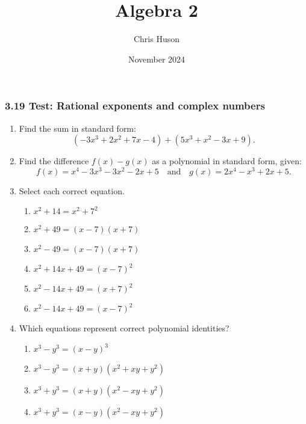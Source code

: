 \documentclass[12pt, twoside]{article}
\title{Algebra 2}
\author{Chris Huson}
\date{November 2024}
\begin{document}
\subsubsection*{3.19 Test: Rational exponents and complex numbers}
\begin{enumerate}[itemsep=0.5cm]
\subsubsection*{A1-APR.1 Perform operations with polynomials}
\item Find the sum in standard form:
\[
(- 3x^3 + 2x^2 + 7x - 4) + (5x^3 + x^2 - 3x + 9).
\] \vspace{4cm}

\item Find the difference \(f(x) - g(x)\) as a polynomial in standard form, given:
\[
f(x) = x^4 - 3x^3 - 3x^2 - 2x + 5 \quad \text{and} \quad g(x) = 2x^4 - x^3 + 2x + 5.
\] \vspace{4cm}

\item Select each correct equation.
\begin{multicols}{2}
    \begin{enumerate}
    \item $x^2 + 14 = x^2 + 7^2$
    \item $x^2 + 49 = (x-7)(x+7)$
    \item $x^2 - 49 = (x-7)(x+7)$
    \item $x^2 + 14x + 49 = (x-7)^2$
    \item $x^2 - 14x + 49 = (x+7)^2$
    \item $x^2 - 14x + 49 = (x-7)^2$
    \end{enumerate}
\end{multicols}
        
\item Which equations represent correct polynomial identities?
\begin{multicols}{2}
    \begin{enumerate}
    \item \(x^3 - y^3 = (x - y)^3\)
    \item \(x^3 - y^3 = (x + y)(x^2 + xy + y^2)\)
    \item \(x^3 + y^3 = (x + y)(x^2 - xy + y^2)\)
    \item \(x^3 + y^3 = (x - y)(x^2 - xy + y^2)\)
\end{enumerate}
\end{multicols}
    

\end{enumerate}
\end{document}
